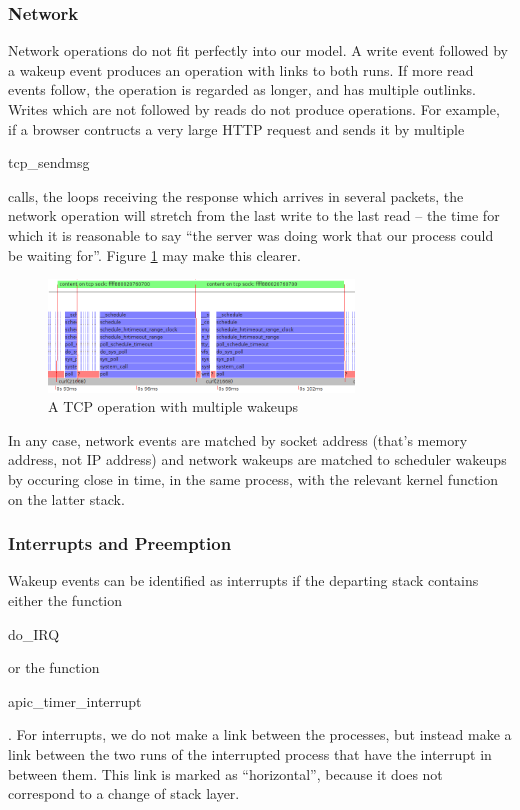 \documentclass[10pt]{article}
\begin{document}
\subsubsection{Network}

Network operations do not fit perfectly into our model.  A write event followed by a wakeup event produces an operation with links to both runs.  If more read events follow, the operation is regarded as longer, and has multiple outlinks.  Writes which are not followed by reads do not produce operations.  For example, if a browser contructs a very large HTTP request and sends it by multiple \begin{tt}tcp\_sendmsg\end{tt} calls, the loops receiving the response which arrives in several packets, the network operation will stretch from the last write to the last read -- the time for which it is reasonable to say ``the server was doing work that our process could be waiting for''.  Figure \ref{fig:tcp} may make this clearer. 

\begin{figure}[h!]
\includegraphics[width=3.2in]{images/tcpexample}
\caption{A TCP operation with multiple wakeups}
\label{fig:tcp}
\end{figure}

In any case, network events are matched by socket address (that's memory address, not IP address) and network wakeups are matched to scheduler wakeups by occuring close in time, in the same process, with the relevant kernel function on the latter stack.

\subsubsection{Interrupts and Preemption}

Wakeup events can be identified as interrupts if the departing stack
contains either the function \begin{tt}do\_IRQ\end{tt} or the
  function \begin{tt}apic\_timer\_interrupt\end{tt}.  For interrupts, we do not make a link between the processes, but instead make a link between the two runs of the interrupted process that have the interrupt in between them.  This link is marked as ``horizontal'', because it does not correspond to a change of stack layer.
\end{document}
